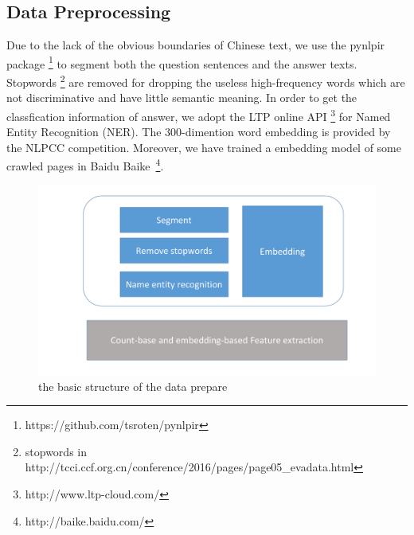 \documentclass{llncs}
\begin{document}
\subsection{Data Preprocessing}
\label{sec:preprocess}

Due to the lack of the obvious boundaries of Chinese text, we use the pynlpir package \footnote{https://github.com/tsroten/pynlpir} \cite{Liu2010Language} to segment both the question sentences and the answer texts. Stopwords \footnote{stopwords in http://tcci.ccf.org.cn/conference/2016/pages/page05\_evadata.html} are removed for dropping the useless high-frequency words which are not discriminative and have little semantic meaning. In order to get the classfication information of answer, we adopt the LTP online API \footnote{http://www.ltp-cloud.com/} for Named Entity Recognition (NER). The 300-dimention word embedding is provided by the NLPCC competition. Moreover, we have trained a embedding model of some crawled pages in Baidu Baike~\footnote{http://baike.baidu.com/}. 
\begin{figure}
\centering
\includegraphics[width=12cm]{figures/structure.pdf}
\caption{the basic structure of the data prepare}
\label{fig:structure}
\end{figure}



\end{document}
